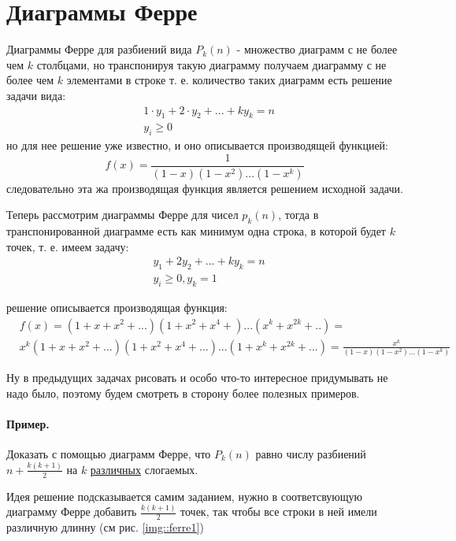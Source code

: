 \section{Диаграммы Ферре}

Диаграммы Ферре для разбиений вида $P_k\left(n\right)$ - множество диаграмм с не более чем $k$ столбцами, но транспонируя такую диаграмму получаем диаграмму с не более чем $k$ элементами в строке т. е. количество таких диаграмм  есть решение задачи вида:
\[
	\begin{split}
		& 1\cdot y_1 + 2\cdot y_2 + ... + k y_k = n \\
		& y_i \ge 0
	\end{split}
\]
но для нее решение уже известно, и оно описывается производящей функцией:
\[
	f\left(x\right) = \frac{1}{\left(1-x\right)\left(1-x^2\right)...\left(1-x^k\right)}
\]
следовательно эта жа производящая функция является решением исходной задачи.

Теперь рассмотрим диаграммы Ферре для чисел $p_k\left(n\right)$, тогда в транспонированной диаграмме есть как минимум одна строка, в которой будет $k$ точек, т. е. имеем задачу:
\[
	\begin{split}
		& y_1 + 2 y_2 + ... +k y_k = n\\
		& y_i \ge 0, y_k = 1
	\end{split}
\]

решение описывается производящая функция:
\[
	\begin{split}
		&f\left(x\right) = \left(1+x+x^2+...\right)\left(1+x^2+x^4+\right)...\left(x^k+x^{2k}+..\right) = \\
		& x^k \left(1+x+x^2+...\right)\left(1+x^2+x^4+...\right)...\left(1+x^k+x^{2k}+...\right) = \frac{x^k}{\left(1-x\right)\left(1-x^2\right)...\left(1-x^k\right)}
	\end{split}
\]

Ну в предыдущих задачах рисовать и особо что-то интересное придумывать не надо было, поэтому будем смотреть в сторону более полезных примеров.

\paragraph{Пример.} Доказать с помощью диаграмм Ферре, что $P_k\left(n\right)$ равно числу разбиений $n + \frac{k\left(k+1\right)}{2}$ на $k$ \underline{различных} слогаемых.

Идея решение подсказывается самим заданием, нужно в соответсвующую диаграмму Ферре добавить $\frac{k\left(k+1\right)}{2}$ точек, так чтобы все строки в ней имели различную длинну (см рис. \ref{img::ferre1})

